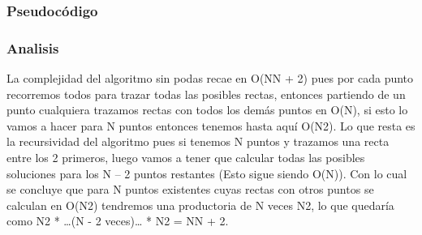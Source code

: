 \subsubsection{Pseudocódigo}

\subsubsection{Analisis}

La complejidad del algoritmo sin podas recae en O(NN + 2) pues por cada punto recorremos todos para trazar todas las posibles rectas, entonces partiendo de un punto cualquiera trazamos rectas con todos los demás puntos en O(N), si esto lo vamos a hacer para N puntos entonces tenemos hasta aquí O(N2). Lo que resta es la recursividad del algoritmo pues si tenemos N puntos y trazamos una recta entre los 2 primeros, luego vamos a tener que calcular todas las posibles soluciones para los N – 2 puntos restantes (Esto sigue siendo O(N)). Con lo cual se concluye que para N puntos existentes cuyas rectas con otros puntos se calculan en O(N2) tendremos una productoria de N veces N2, lo que quedaría como N2 * …(N - 2 veces)… * N2 = NN + 2.
